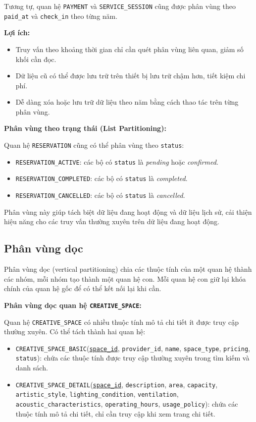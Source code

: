 Tương tự, quan hệ \texttt{PAYMENT} và \texttt{SERVICE\_SESSION} cũng được phân vùng theo \texttt{paid\_at} và \texttt{check\_in} theo từng năm.

\textbf{Lợi ích:}
\begin{itemize}
    \item Truy vấn theo khoảng thời gian chỉ cần quét phân vùng liên quan, giảm số khối cần đọc.
    \item Dữ liệu cũ có thể được lưu trữ trên thiết bị lưu trữ chậm hơn, tiết kiệm chi phí.
    \item Dễ dàng xóa hoặc lưu trữ dữ liệu theo năm bằng cách thao tác trên từng phân vùng.
\end{itemize}

\textbf{Phân vùng theo trạng thái (List Partitioning):}

Quan hệ \texttt{RESERVATION} cũng có thể phân vùng theo \texttt{status}:

\begin{itemize}
    \item \texttt{RESERVATION\_ACTIVE}: các bộ có \texttt{status} là \textit{pending} hoặc \textit{confirmed}.
    \item \texttt{RESERVATION\_COMPLETED}: các bộ có \texttt{status} là \textit{completed}.
    \item \texttt{RESERVATION\_CANCELLED}: các bộ có \texttt{status} là \textit{cancelled}.
\end{itemize}

Phân vùng này giúp tách biệt dữ liệu đang hoạt động và dữ liệu lịch sử, cải thiện hiệu năng cho các truy vấn thường xuyên trên dữ liệu đang hoạt động.

\subsection{Phân vùng dọc}

Phân vùng dọc (vertical partitioning) chia các thuộc tính của một quan hệ thành các nhóm, mỗi nhóm tạo thành một quan hệ con. Mỗi quan hệ con giữ lại khóa chính của quan hệ gốc để có thể kết nối lại khi cần.

\textbf{Phân vùng dọc quan hệ \texttt{CREATIVE\_SPACE}:}

Quan hệ \texttt{CREATIVE\_SPACE} có nhiều thuộc tính mô tả chi tiết ít được truy cập thường xuyên. Có thể tách thành hai quan hệ:

\begin{itemize}
    \item \texttt{CREATIVE\_SPACE\_BASIC}(\underline{\texttt{space\_id}}, \texttt{provider\_id}, \texttt{name}, \texttt{space\_type}, \texttt{pricing}, \texttt{status}): chứa các thuộc tính được truy cập thường xuyên trong tìm kiếm và danh sách.
    \item \texttt{CREATIVE\_SPACE\_DETAIL}(\underline{\texttt{space\_id}}, \texttt{description}, \texttt{area}, \texttt{capacity}, \texttt{artistic\_style}, \texttt{lighting\_condition}, \texttt{ventilation}, \texttt{acoustic\_characteristics}, \texttt{operating\_hours}, \texttt{usage\_policy}): chứa các thuộc tính mô tả chi tiết, chỉ cần truy cập khi xem trang chi tiết.
\end{itemize}


